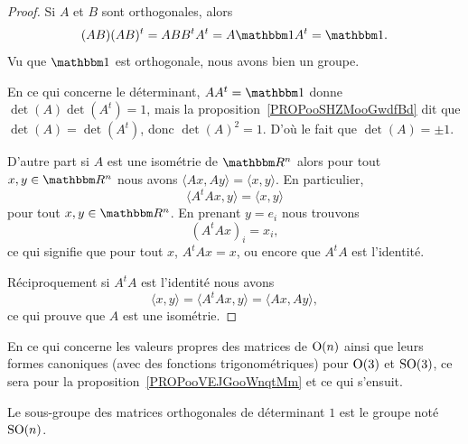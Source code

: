 \begin{proof}
    Si \( A\) et \( B\) sont orthogonales, alors
    \begin{equation}
        (AB)(AB)^t=ABB^tA^t=A\mtu A^t=\mtu.
    \end{equation}
    Vu que \( \mtu\) est orthogonale, nous avons bien un groupe.

    En ce qui concerne le déterminant, \( AA^t=\mtu\) donne \( \det(A)\det(A^t)=1\), mais la proposition~\ref{PROPooSHZMooGwdfBd} dit que \( \det(A)=\det(A^t)\), donc \( \det(A)^2=1\). D'où le fait que \( \det(A)=\pm 1\).

    D'autre part si \( A\) est une isométrie de \( \eR^n\) alors pour tout \( x,y\in \eR^n\) nous avons \( \langle Ax, Ay\rangle =\langle x, y\rangle \). En particulier,
    \begin{equation}
        \langle A^tAx, y\rangle =\langle x, y\rangle
    \end{equation}
    pour tout \( x,y\in \eR^n\). En prenant \( y=e_i\) nous trouvons
    \begin{equation}
        (A^tAx)_i=x_i,
    \end{equation}
    ce qui signifie que pour tout \( x\), \( A^tAx=x\), ou encore que \( A^tA\) est l'identité.

    Réciproquement si \( A^tA\) est l'identité nous avons
    \begin{equation}
        \langle x, y\rangle =\langle A^tAx, y\rangle =\langle Ax, Ay\rangle ,
    \end{equation}
    ce qui prouve que \( A\) est une isométrie.
\end{proof}

En ce qui concerne les valeurs propres des matrices de \( \operatorname{O}(n)\) ainsi que leurs formes canoniques (avec des fonctions trigonométriques) pour \( \operatorname{O}(3)\) et \( \operatorname{SO}(3)\), ce sera pour la proposition~\ref{PROPooVEJGooWnqtMm} et ce qui s'ensuit.

\begin{definition}      \label{DEFooJLNQooBKTYUy}
    Le sous-groupe des matrices orthogonales de déterminant \( 1\) est le groupe  noté \( \operatorname{SO}(n)\).
\end{definition}

